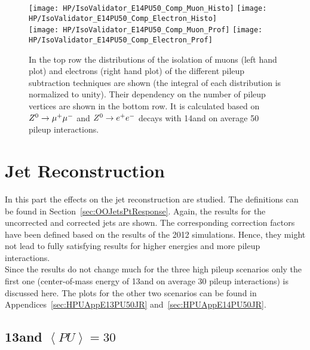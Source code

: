 \begin{figure}[h!t]
  \centering
  \texttt{[image: HP/IsoValidator\_E14PU50\_Comp\_Muon\_Histo]}
  \texttt{[image: HP/IsoValidator\_E14PU50\_Comp\_Electron\_Histo]}
  \\
  \texttt{[image: HP/IsoValidator\_E14PU50\_Comp\_Muon\_Prof]}
  \texttt{[image: HP/IsoValidator\_E14PU50\_Comp\_Electron\_Prof]}
  \caption[Distribution of the isolation of muons and electrons and their dependence on the number of pileup vertices for events with 14\TeV and PU=50]{In the top row the distributions of the isolation of muons (left hand plot) and electrons (right hand plot) of the different pileup subtraction techniques are shown (the integral of each distribution is normalized to unity). Their dependency on the number of pileup vertices are shown in the bottom row. It is calculated based on ${Z^{0}}\rightarrow\mu^+\mu^-$ and ${Z^{0}}\rightarrow e^+e^-$ decays with 14\TeV and on average 50 pileup interactions.\label{plot:HPUIsoE14PU50}}
\end{figure}

\section{Jet Reconstruction \label{sec:HPUJet}}

In this part the effects on the jet reconstruction are studied. The definitions can be found in Section~\ref{sec:OOJetsPtResponse}. Again, the results for the uncorrected and corrected jets are shown. The corresponding correction factors have been defined based on the results of the 2012 simulations. Hence, they might not lead to fully satisfying results for higher energies and more pileup interactions. \\
Since the results do not change much for the three high pileup scenarios only the first one (center-of-mass energy of 13\TeV and on average 30 pileup interactions) is discussed here. The plots for the other two scenarios can be found in Appendices~\ref{sec:HPUAppE13PU50JR} and~\ref{sec:HPUAppE14PU50JR}.

\subsection{13\TeV and $\left<PU\right> =30$ \label{sec:HPUJetE13PU30}}

